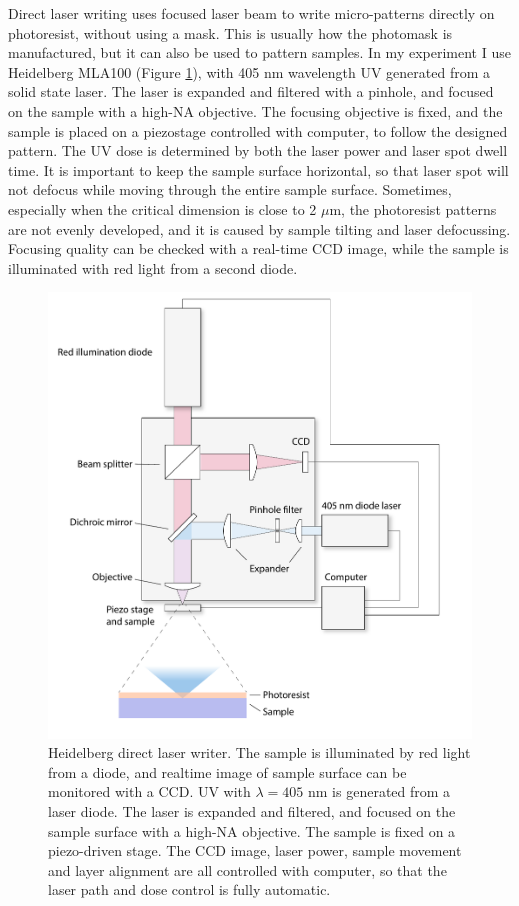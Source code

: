 \documentclass[pdflatex, sectionletters, 12pt]{pittetd}    %
\begin{document}
Direct laser writing uses focused laser beam to write micro-patterns directly on photoresist, without using a mask. This is usually how the photomask is manufactured, but it can also be used to pattern samples. In my experiment I use Heidelberg MLA100 (Figure \ref{FIG:Heidelberg}), with 405 nm wavelength UV generated from a solid state laser. The laser is expanded and filtered with a pinhole, and focused on the sample with a high-NA objective. The focusing objective is fixed, and the sample is placed on a piezostage controlled with computer, to follow the designed pattern. The UV dose is determined by both the laser power and laser spot dwell time. It is important to keep the sample surface horizontal, so that laser spot will not defocus while moving through the entire sample surface. Sometimes, especially when the critical dimension is close to 2 $\mu$m, the photoresist patterns are not evenly developed, and it is caused by sample tilting and laser defocussing. Focusing quality can be checked with a real-time CCD image, while the sample is illuminated with red light from a second diode.

\begin{figure}[hp]
	\centering
	\includegraphics[width=1.0\textwidth]{Drawing/Heidelberg.pdf}
	\caption{Heidelberg direct laser writer. The sample is illuminated by red light from a diode, and realtime image of sample surface can be monitored with a CCD. UV with $\lambda=405$ nm is generated from a laser diode. The laser is expanded and filtered, and focused on the sample surface with a high-NA objective. The sample is fixed on a piezo-driven stage. The CCD image, laser power, sample movement and layer alignment are all controlled with computer, so that the laser path and dose control is fully automatic.}
	\label{FIG:Heidelberg}
\end{figure}
\end{document}
